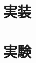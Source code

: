 \documentclass[12pt,oneside]{report}
\begin{document}
\chapter{実装}
\label{impr}


\chapter{実験}
\label{exp}



\end{document}
